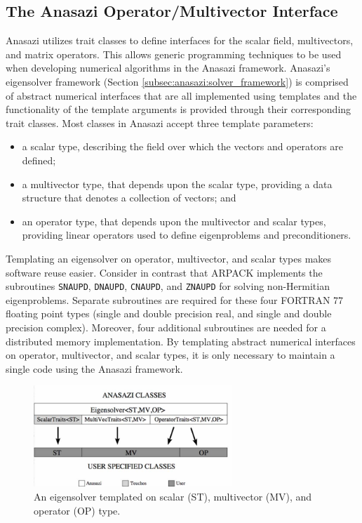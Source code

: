 \documentclass[acmtoms]{acmtrans2m}
\newcounter{algorithm}
\begin{document}
\subsection{The Anasazi Operator/Multivector Interface}
\label{sec:anasazi:opvec}

Anasazi utilizes trait \cite{myer:95,veld:96} classes to define interfaces for the scalar field,
multivectors, and matrix operators. This allows generic programming techniques to
be used when developing numerical algorithms in the Anasazi framework.  
Anasazi's eigensolver framework (Section  
\ref{subsec:anasazi:solver_framework}) is comprised of abstract numerical interfaces
that are all implemented using templates and the functionality of the 
template arguments is provided through their corresponding trait classes.
Most classes in Anasazi accept
three template parameters:
\begin{itemize}
\item
a scalar type, describing the field over which the vectors and
operators are defined;
\item
a multivector type, that depends upon the scalar type, providing a
data structure that denotes a collection of vectors; and
\item
an operator type, that depends upon the multivector and scalar types,
providing linear operators used to define eigenproblems and
preconditioners.
\end{itemize}

Templating an eigensolver on operator, multivector, and scalar types makes software reuse
easier. Consider in contrast that ARPACK implements the subroutines \texttt{SNAUPD},
\texttt{DNAUPD}, \texttt{CNAUPD}, and \texttt{ZNAUPD} for solving non-Hermitian
eigenproblems. Separate subroutines are required for these four FORTRAN 77 floating
point types (single and double precision real, and single and double precision complex).
Moreover, four additional subroutines are needed for a distributed memory implementation.
By templating abstract numerical interfaces on operator, multivector, and scalar types, 
it is only necessary to maintain a single code using the Anasazi framework.

\begin{figure}[htb]
\label{fig:latemplate}
\begin{center}
\includegraphics[height=1.5in]{anasazi_linalg_template}
\end{center}
\caption{An eigensolver templated on scalar (ST), multivector (MV), and
operator (OP) type.}
\end{figure}
\end{document}
